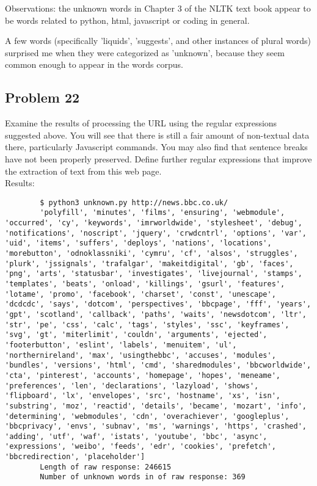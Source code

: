 \documentclass[12pt]{article}
\begin{document}
		Observations: the unknown words in Chapter 3 of the NLTK text book appear to be words related to python, html, javascript or coding in general. 
		
		A few words (specifically 'liquids', 'suggests', and other instances of plural words) surprised me when they were categorized as 'unknown', because they seem common enough to appear in the words corpus.
		
		\subsection*{Problem 22}
		Examine the results of processing the URL  using the regular expressions suggested above. You will see that there is still a fair amount of non-textual data there, particularly Javascript commands. You may also find that sentence breaks have not been properly preserved. Define further regular expressions that improve the extraction of text from this web page.\\
		
		Results:
		\begin{lstlisting}
		$ python3 unknown.py http://news.bbc.co.uk/
		'polyfill', 'minutes', 'films', 'ensuring', 'webmodule', 'occurred', 'cy', 'keywords', 'imrworldwide', 'stylesheet', 'debug', 'notifications', 'noscript', 'jquery', 'crwdcntrl', 'options', 'var', 'uid', 'items', 'suffers', 'deploys', 'nations', 'locations', 'morebutton', 'odnoklassniki', 'cymru', 'cf', 'alsos', 'struggles', 'plurk', 'jssignals', 'trafalgar', 'makeitdigital', 'gb', 'faces', 'png', 'arts', 'statusbar', 'investigates', 'livejournal', 'stamps', 'templates', 'beats', 'onload', 'killings', 'gsurl', 'features', 'lotame', 'promo', 'facebook', 'charset', 'const', 'unescape', 'dcdcdc', 'says', 'dotcom', 'perspectives', 'bbcpage', 'fff', 'years', 'gpt', 'scotland', 'callback', 'paths', 'waits', 'newsdotcom', 'ltr', 'str', 'pe', 'css', 'calc', 'tags', 'styles', 'ssc', 'keyframes', 'svg', 'gt', 'miterlimit', 'couldn', 'arguments', 'ejected', 'footerbutton', 'eslint', 'labels', 'menuitem', 'ul', 'northernireland', 'max', 'usingthebbc', 'accuses', 'modules', 'bundles', 'versions', 'html', 'cmd', 'sharedmodules', 'bbcworldwide', 'cta', 'pinterest', 'accounts', 'homepage', 'hopes', 'meneame', 'preferences', 'len', 'declarations', 'lazyload', 'shows', 'flipboard', 'lx', 'envelopes', 'src', 'hostname', 'xs', 'isn', 'substring', 'moz', 'reactid', 'details', 'became', 'mozart', 'info', 'determining', 'webmodules', 'cdn', 'overachiever', 'googleplus', 'bbcprivacy', 'envs', 'subnav', 'ms', 'warnings', 'https', 'crashed', 'adding', 'utf', 'waf', 'istats', 'youtube', 'bbc', 'async', 'expressions', 'weibo', 'feeds', 'edr', 'cookies', 'prefetch', 'bbcredirection', 'placeholder']
		Length of raw response: 246615
		Number of unknown words in of raw response: 369
		\end{lstlisting}
		
\end{document}
